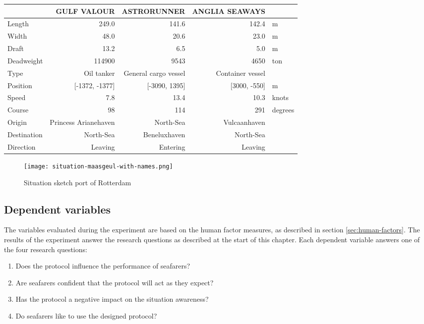 \begin{table}[p]
	\centering
	\begin{tabular}{l | r r r l}
		\toprule
		& GULF VALOUR & ASTRORUNNER & ANGLIA SEAWAYS & \\
		\midrule
		Length     & 249.0    & 141.6    &  142.4 & m \\
		Width     & 48.0    & 20.6    &  23.0 & m  \\
		Draft     & 13.2    & 6.5    &  5.0 & m  \\
		Deadweight & 114900 & 9543 & 4650 & ton \\
		Type     & Oil tanker    & General cargo vessel    &  Container vessel & \\
		\midrule
		Position& [-1372, -1377]    & [-3090, 1395]    &  [3000, -550] & m \\
		Speed     & 7.8    & 13.4    &  10.3 & knots\\
		Course     & 98    & 114    &  291 & degrees \\
		Origin & Princess Arianehaven & North-Sea & Vulcaanhaven \\
		Destination & North-Sea & Beneluxhaven & North-Sea \\
		Direction & Leaving & Entering & Leaving & \\
		\bottomrule
	\end{tabular}
	
	\label{tab:info-Rotterdam}
\end{table}

\begin{figure}[p]
	\centering
	\texttt{[image: situation-maasgeul-with-names.png]}
	\caption{Situation sketch port of Rotterdam}
	\label{fig:entering-maasgeul}
\end{figure}

\clearpage

\subsection{Dependent variables}
The variables evaluated during the experiment are based on the human factor measures, as described in section \ref{sec:human-factors}. The results of the experiment answer the research questions as described at the start of this chapter. Each dependent variable answers one of the four research questions:

\begin{spacing}{1}
\begin{enumerate}
	\item Does the protocol influence the performance of seafarers?
	\item Are seafarers confident that the protocol will act as they expect?
	\item Has the protocol a negative impact on the situation awareness?
	\item Do seafarers like to use the designed protocol?
\end{enumerate}
\end{spacing}

